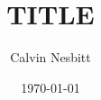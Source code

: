 \documentclass[11pt,a4,oneside]{article}
\title{TITLE}
\date{\today}
\author{Calvin Nesbitt}
\begin{document}
\maketitle 


\tableofcontents 
\newpage
{}

%
\clearpage 

 \newcommand{\bibLocation}{/Users/cfn18/Documents/PhD-Work/PhD-Latex-Repository/BibTex-Files} %
\end{document}
